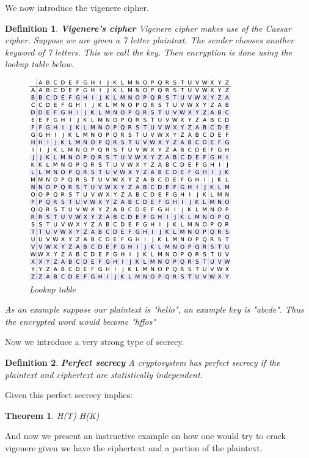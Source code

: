 \documentclass[titlepage]{article}
\newtheorem{theorem}{Theorem}[section]
\newtheorem{definition}{Definition}
\begin{document}
We now introduce the vigenere cipher.
\begin{definition}\textbf{Vigenere's cipher}
Vigenere cipher makes use of the Caesar cipher. Suppose we are given a 7 letter plaintext. The sender chooses another keyword of 7 letters. This we call the key. Then encryption is done using the lookup table below.

\begin{figure}[H]
    \centering
    \includegraphics[scale = 0.6]{src/vigenere.png}
    \caption{Lookup table}
    \label{fig:my_label}
\end{figure}

As an example suppose our plaintext is "hello", an example key is "abcde". Thus the encrypted word would become "hffos"
\end{definition}

Now we introduce a very strong type of secrecy. 

\begin{definition}\textbf{Perfect secrecy}
A cryptosystem has perfect secrecy if the plaintext and ciphertext are statistically independent. 
\end{definition}

Given this perfect secrecy implies:
\begin{theorem}
H(T) \leq H(K)
\end{theorem}

And now we present an instructive example on how one would try to crack vigenere given we have the ciphertext and a portion of the plaintext.

\clearpage
\end{document}
